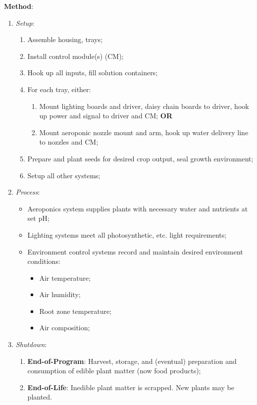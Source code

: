 \documentclass{../tex/report}
\begin{document}
\textbf{Method}:
\begin{enumerate}
    \item \textit{Setup}:
    \begin{enumerate}
        \item Assemble housing, trays;
        \item Install control module(s) (CM);
        \item Hook up all inputs, fill solution containers;
        \item For each tray, either:
        \begin{enumerate}
            \item Mount lighting boards and driver, daisy chain boards to driver, hook up power and signal to driver and CM; \textbf{OR}
            \item Mount aeroponic nozzle mount and arm, hook up water delivery line to nozzles and CM;
        \end{enumerate}
        \item Prepare and plant seeds for desired crop output, seal growth environment;
        \item Setup all other systems;
    \end{enumerate}
    \item \textit{Process}:
    \begin{itemize}
        \item Aeroponics system supplies plants with necessary water and nutrients at set pH;
        \item Lighting systems meet all photosynthetic, etc. light requirements;
        \item Environment control systems record and maintain desired environment conditions:
        \begin{itemize}
            \item Air temperature;
            \item Air humidity;
            \item Root zone temperature;
            \item Air composition;
        \end{itemize}
    \end{itemize}
    \item \textit{Shutdown}:
    \begin{enumerate}
        \item \textbf{End-of-Program}: Harvest, storage, and (eventual) preparation and consumption of edible plant matter (now food products);
        \item \textbf{End-of-Life}: Inedible plant matter is scrapped. New plants may be planted.
    \end{enumerate}
\end{enumerate}
\end{document}
